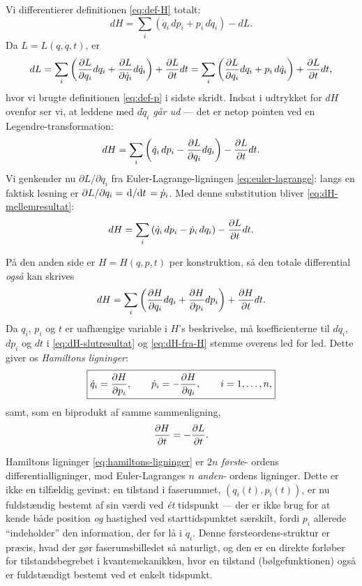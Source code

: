 Vi differentierer definitionen \eqref{eq:def-H} totalt:
\begin{equation}
  dH = \sum_i\left(\dot q_i\,dp_i + p_i\,d\dot q_i\right) - dL.
\end{equation}
Da $L=L(q,\dot q,t)$, er
\begin{equation}
  dL = \sum_i\left(\pdv{L}{q_i}dq_i + \pdv{L}{\dot q_i}d\dot q_i\right) + \pdv{L}{t}dt
     = \sum_i\left(\pdv{L}{q_i}dq_i + p_i\,d\dot q_i\right) + \pdv{L}{t}dt,
\end{equation}
hvor vi brugte definitionen \eqref{eq:def-p} i sidste skridt. Indsat i
udtrykket for $dH$ ovenfor ser vi, at leddene med $d\dot q_i$
\emph{går ud} — det er netop pointen ved en Legendre-transformation:
\begin{equation}
  dH = \sum_i\left(\dot q_i\,dp_i - \pdv{L}{q_i}dq_i\right) - \pdv{L}{t}dt.
  \label{eq:dH-mellemresultat}
\end{equation}
Vi genkender nu $\partial L/\partial q_i$ fra Euler-Lagrange-ligningen
\eqref{eq:euler-lagrange}: langs en faktisk løsning er
$\partial L/\partial q_i = \dv*{}{t}(\partial L/\partial \dot q_i) =
\dot p_i$. Med denne substitution bliver
\eqref{eq:dH-mellemresultat}:
\begin{equation}
  dH = \sum_i\left(\dot q_i\,dp_i - \dot p_i\,dq_i\right) - \pdv{L}{t}dt.
  \label{eq:dH-slutresultat}
\end{equation}

På den anden side er $H=H(q,p,t)$ per konstruktion, så den totale
differential \emph{også} kan skrives
\begin{equation}
  dH = \sum_i\left(\pdv{H}{q_i}dq_i + \pdv{H}{p_i}dp_i\right) + \pdv{H}{t}dt.
  \label{eq:dH-fra-H}
\end{equation}
Da $q_i$, $p_i$ og $t$ er uafhængige variable i $H$'s beskrivelse, må
koefficienterne til $dq_i$, $dp_i$ og $dt$ i
\eqref{eq:dH-slutresultat} og \eqref{eq:dH-fra-H} stemme overens led
for led. Dette giver os \emph{Hamiltons ligninger}:
\begin{equation}
  \boxed{\dot q_i = \pdv{H}{p_i}, \qquad \dot p_i = -\pdv{H}{q_i}, \qquad i=1,\dots,n,}
  \label{eq:hamiltons-ligninger}
\end{equation}
samt, som en biprodukt af samme sammenligning,
\begin{equation}
  \pdv{H}{t} = -\pdv{L}{t}.
  \label{eq:dH-dt}
\end{equation}

\begin{bemaerkning}
Hamiltons ligninger \eqref{eq:hamiltons-ligninger} er $2n$ \emph{først}e-
ordens differentialligninger, mod Euler-Lagranges $n$ \emph{anden}-
ordens ligninger. Dette er ikke en tilfældig gevinst: en tilstand i
faserummet, $(q_i(t),p_i(t))$, er nu fuldstændig bestemt af sin værdi
ved \emph{ét} tidspunkt — der er ikke brug for at kende både position
\emph{og} hastighed ved starttidspunktet særskilt, fordi $p_i$ allerede
``indeholder'' den information, der før lå i $\dot q_i$. Denne
førsteordens-struktur er præcis, hvad der gør faserumsbilledet så
naturligt, og den er en direkte forløber for tilstandsbegrebet i
kvantemekanikken, hvor en tilstand (bølgefunktionen) også er
fuldstændigt bestemt ved et enkelt tidspunkt.
\end{bemaerkning}

